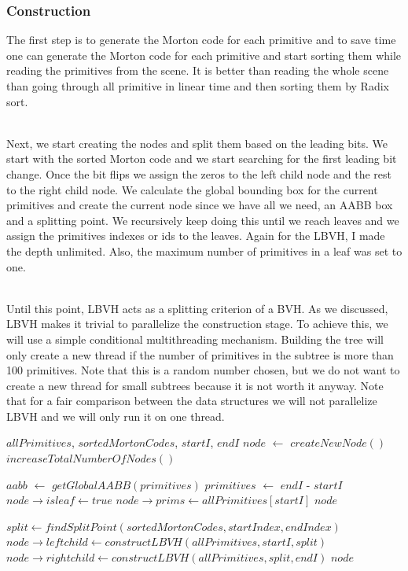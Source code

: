 \documentclass[11pt,a4paper]{article}
\begin{document}
\subsubsection{Construction}
The first step is to generate the Morton code for each primitive and to save time one can generate the Morton code for each primitive and start sorting them while reading the primitives from the scene. It is better than reading the whole scene than going through all primitive in linear time and then sorting them by Radix sort. 

\noindent
\\
Next, we start creating the nodes and split them based on the leading bits. We start with the sorted Morton code and we start searching for the first leading bit change. Once the bit flips we assign the zeros to the left child node and the rest to the right child node. We calculate the global bounding box for the current primitives and create the current node since we have all we need, an AABB box and a splitting point. We recursively keep doing this until we reach leaves and we assign the primitives indexes or ids to the leaves. Again for the LBVH, I made the depth unlimited. Also, the maximum number of primitives in a leaf was set to one.

\noindent
\\
Until this point, LBVH acts as a splitting criterion of a BVH. As we discussed, LBVH makes it trivial to parallelize the construction stage. To achieve this, we will use a simple conditional multithreading mechanism. Building the tree will only create a new thread if the number of primitives in the subtree is more than 100 primitives. Note that this is a random number chosen, but we do not want to create a new thread for small subtrees because it is not worth it anyway. Note that for a fair comparison between the data structures we will not parallelize LBVH and we will only run it on one thread. 

\begin{algorithm}[H]
\caption{$constructLBVH$}\label{alg:alg1}
\begin{algorithmic}
		\Require $allPrimitives$, $sortedMortonCodes$, $startI$, $endI$
\State $node$ $\gets$ $createNewNode()$
\State $increaseTotalNumberOfNodes()$

\State $aabb$ $\gets$ $getGlobalAABB(primitives)$
\State $primitives$ $\gets$  $endI$ - $startI$
	\State $node \rightarrow isleaf \gets true$
	\State $node \rightarrow prims \gets allPrimitives[startI]$
	\State \Return $node$
\EndIf

\State $split \gets findSplitPoint(sortedMortonCodes, startIndex, endIndex)$
\State $node \rightarrow leftchild  \gets constructLBVH(allPrimitives, startI, split)$
\State $node \rightarrow rightchild  \gets constructLBVH(allPrimitives, split, endI)$
\State \Return $node$
\end{algorithmic}
\end{algorithm}
\clearpage
\end{document}
